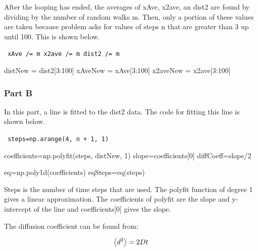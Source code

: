 \documentclass[notitlepage,aps,prd,nofootinbib]{revtex4-1}
\begin{document}
After the looping has ended, the averages of xAve, x2ave, an dist2 are found by dividing by the number of random walks m. Then, only a portion of these values are taken because problem asks for values of steps n that are greater than 3 up until 100. This is shown below. \newline 

{\tt 
\noindent xAve /= m                   \newline
\noindent x2ave /= m                  \newline
\noindent dist2 /= m                  \newline

\noindent distNew = dist2[3:100]      \newline                    
\noindent xAveNew = xAve[3:100]       \newline                     
\noindent x2aveNew = x2ave[3:100]                   
}

\subsubsection{Part B}

In this part, a line is fitted to the dist2 data. The code for fitting this line is shown below. \newline

{\tt 
	\noindent steps=np.arange(4, n + 1, 1)                   \newline    
	
	\noindent coefficients=np.polyfit(steps, distNew, 1)     \newline 
	\noindent slope=coefficients[0]                          \newline          
	\noindent diffCoeff=slope/2                              \newline         
	
	\noindent eq=np.poly1d(coefficients)                     \newline               
	\noindent eqSteps=eq(steps)   }                          \newline


Steps is the number of time steps that are used. The polyfit function of degree 1 gives a linear approximation. The coefficients of polyfit are the slope and y-intercept of the line and coefficients[0] gives the slope. 

The diffusion coefficient can be found from:

\begin{equation}
	\expval{d^{2}}=2Dt
\end{equation}
\end{document}
